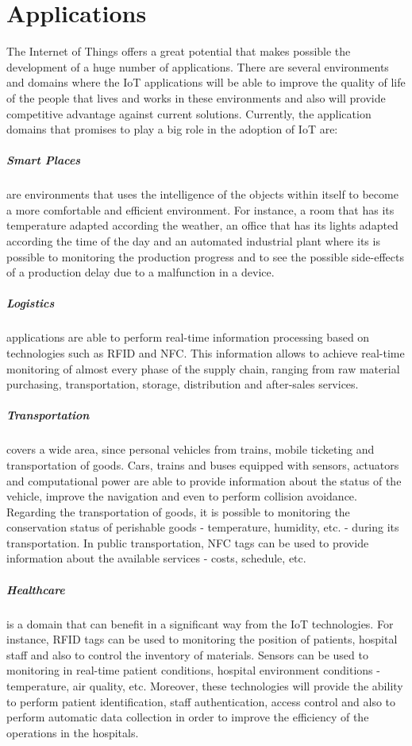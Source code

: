 \section{Applications}
\label{sec:applications}
The Internet of Things offers a great potential that makes possible the development of a huge number
of applications. There are several environments and domains where the \gls{IoT} applications will be
able to improve the quality of life of the people that lives and works in these environments and also
will provide competitive advantage against current solutions. Currently, the application domains that
promises to play a big role in the adoption of \gls{IoT} are:
\subparagraph{Smart Places} are environments that uses the intelligence of the objects within itself
to become a more comfortable and efficient environment. For instance, a room that has its temperature
adapted according the weather, an office that has its lights adapted according the time of the day and
an automated industrial plant where its is possible to monitoring the production progress and to see
the  possible side-effects of a production delay due to a malfunction in a device.
\subparagraph{Logistics} applications are able to perform real-time information processing based
on technologies such as \gls{RFID} and \gls{NFC}. This information allows to achieve real-time monitoring
of almost every phase of the supply chain, ranging from raw material purchasing, transportation,
storage, distribution and after-sales services.
\subparagraph{Transportation} covers a wide area, since personal vehicles from trains, mobile ticketing
and transportation of goods. Cars, trains and buses equipped with sensors, actuators and computational
power are able to provide information about the status of the vehicle, improve the navigation and even
to perform collision avoidance. Regarding the transportation of goods, it is possible to monitoring
the conservation status of perishable goods - temperature, humidity, etc. -  during its transportation.
In public transportation, NFC tags can be used to provide information about the available services
- costs, schedule, etc.
\subparagraph{Healthcare} is a domain that can benefit in a significant way from the \gls{IoT}
technologies. For instance, \gls{RFID} tags can be used to monitoring the position of patients,
hospital staff and also to control the inventory of materials. Sensors can be used to monitoring
in real-time patient conditions, hospital environment conditions - temperature, air quality, etc.
Moreover, these technologies will provide the ability to perform patient identification, staff authentication,
access control and also to perform automatic data collection in order to improve the efficiency of
the operations in the hospitals.

